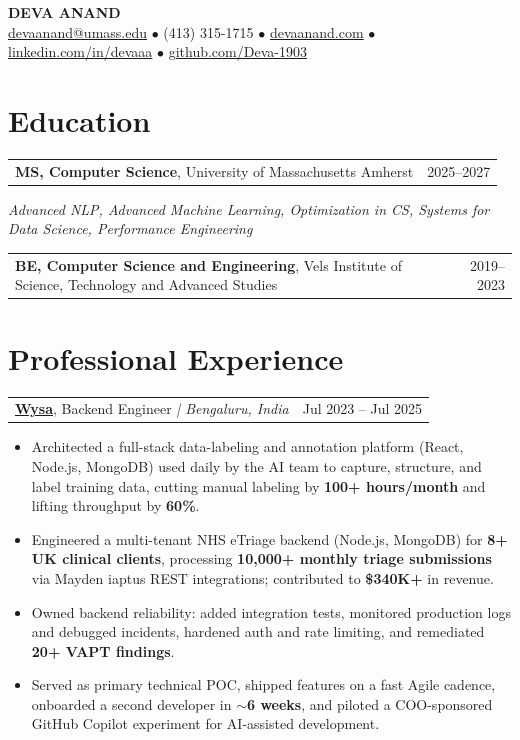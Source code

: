 \documentclass[letterpaper,11pt]{article}
\makeatletter
\newcommand{\eduItem}[3]{%
  \begin{tabular*}{\textwidth}{@{}l@{\extracolsep{\fill}}r@{}}
    \textbf{#1}, #2 & #3 \\
  \end{tabular*}\par
}
\newcommand{\expItem}[4]{%
  \vspace{3pt}
  \begin{tabular*}{\textwidth}{@{}l@{\extracolsep{\fill}}r@{}}
    \textbf{#1}, #2 \textit{| #3} & #4 \\
  \end{tabular*}\par\vspace{-2pt}
}
\makeatother
\begin{document}
\begin{center}
    {\fontsize{18}{20}\selectfont\bfseries DEVA ANAND}\\ \vspace{3pt}
    {\small
    \href{mailto:devaanand@umass.edu}{devaanand@umass.edu}
    \enspace$\bullet$\enspace
    (413) 315-1715
    \enspace$\bullet$\enspace
    \href{https://devaanand.com}{devaanand.com}
    \enspace$\bullet$\enspace
    \href{https://linkedin.com/in/devaaa/}{linkedin.com/in/devaaa}
    \enspace$\bullet$\enspace
    \href{https://github.com/Deva-1903}{github.com/Deva-1903}}
\end{center}
\vspace{-6pt}

\section{Education}
\eduItem{MS, Computer Science}{University of Massachusetts Amherst}{2025--2027}
{\small\textit{Advanced NLP, Advanced Machine Learning, Optimization in CS, Systems for Data Science, Performance Engineering}}\par
\vspace{3pt}
\eduItem{BE, Computer Science and Engineering}{Vels Institute of Science, Technology and Advanced Studies}{2019--2023}

\section{Professional Experience}

\expItem{\href{https://www.wysa.io}{Wysa}}{Backend Engineer}{Bengaluru, India}{Jul 2023 -- Jul 2025}
\begin{itemize}
  \item Architected a full-stack data-labeling and annotation platform (React, Node.js, MongoDB) used daily by the AI team to capture, structure, and label training data, cutting manual labeling by \textbf{100+ hours/month} and lifting throughput by \textbf{60\%}.
  \item Engineered a multi-tenant NHS eTriage backend (Node.js, MongoDB) for \textbf{8+ UK clinical clients}, processing \textbf{10{,}000+ monthly triage submissions} via Mayden iaptus REST integrations; contributed to \textbf{\$340K+} in revenue.
  \item Owned backend reliability: added integration tests, monitored production logs and debugged incidents, hardened auth and rate limiting, and remediated \textbf{20+ VAPT findings}.
  \item Served as primary technical POC, shipped features on a fast Agile cadence, onboarded a second developer in \textbf{$\sim$6 weeks}, and piloted a COO-sponsored GitHub Copilot experiment for AI-assisted development.
\end{itemize}
\end{document}
